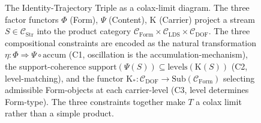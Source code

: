 
\begin{figure}[htbp]
\centering
{}
\caption{The Identity-Trajectory Triple as a colax-limit diagram. The three factor functors $\Phi$ (Form), $\Psi$ (Content), $\mathrm{K}$ (Carrier) project a stream $S \in \mathcal{C}_{\mathrm{Str}}$ into the product category $\mathcal{C}_{\mathrm{Form}} \times \mathcal{C}_{\mathrm{LDS}} \times \mathcal{C}_{\mathrm{DOF}}$. The three compositional constraints are encoded as the natural transformation $\eta : \Phi \Rightarrow \Psi \circ \mathrm{accum}$ (C1, oscillation is the accumulation-mechanism), the support-coherence $\mathrm{support}(\Psi(S)) \subseteq \mathrm{levels}(\mathrm{K}(S))$ (C2, level-matching), and the functor $\mathrm{K}_{*} : \mathcal{C}_{\mathrm{DOF}} \to \mathrm{Sub}(\mathcal{C}_{\mathrm{Form}})$ selecting admissible Form-objects at each carrier-level (C3, level determines Form-type). The three constraints together make $T$ a colax limit rather than a simple product.}
\label{fig:triple-colax-limit}
\end{figure}
